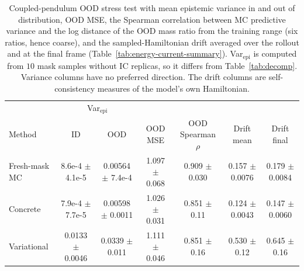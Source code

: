 \begin{table}[t]
\centering
\small
\setlength{\tabcolsep}{3pt}
\caption{Coupled-pendulum OOD stress test with mean epistemic variance in and out of distribution, OOD MSE, the Spearman correlation between MC predictive variance and the log distance of the OOD mass ratio from the training range (six ratios, hence coarse), and the sampled-Hamiltonian drift averaged over the rollout and at the final frame (Table~\ref{tab:energy-current-summary}). Var$_\mathrm{epi}$ is computed from $10$ mask samples without IC replicas, so it differs from Table~\ref{tab:decomp}. Variance columns have no preferred direction. The drift columns are self-consistency measures of the model's own Hamiltonian.}
\label{tab:coupled-pendulum-ood-energy}
\begin{tabular}{lcccccc}
\toprule
 & \multicolumn{2}{c}{Var$_\mathrm{epi}$} &  &  &  &  \\
\cmidrule(lr){2-3}
Method & ID & OOD & OOD MSE & \makecell{OOD Spearman\\ $\rho$} & \makecell{Drift\\ mean} & \makecell{Drift\\ final} \\
\midrule
Fresh-mask MC & \makecell{8.6e-4\\ {\footnotesize $\pm$ 4.1e-5}} & \makecell{0.00564\\ {\footnotesize $\pm$ 7.4e-4}} & \makecell{1.097\\ {\footnotesize $\pm$ 0.068}} & \makecell{0.909\\ {\footnotesize $\pm$ 0.030}} & \makecell{0.157\\ {\footnotesize $\pm$ 0.0076}} & \makecell{0.179\\ {\footnotesize $\pm$ 0.0084}} \\
Concrete & \makecell{7.9e-4\\ {\footnotesize $\pm$ 7.7e-5}} & \makecell{0.00598\\ {\footnotesize $\pm$ 0.0011}} & \makecell{1.026\\ {\footnotesize $\pm$ 0.031}} & \makecell{0.851\\ {\footnotesize $\pm$ 0.11}} & \makecell{0.124\\ {\footnotesize $\pm$ 0.0043}} & \makecell{0.147\\ {\footnotesize $\pm$ 0.0060}} \\
Variational & \makecell{0.0133\\ {\footnotesize $\pm$ 0.0046}} & \makecell{0.0339\\ {\footnotesize $\pm$ 0.011}} & \makecell{1.111\\ {\footnotesize $\pm$ 0.046}} & \makecell{0.851\\ {\footnotesize $\pm$ 0.16}} & \makecell{0.530\\ {\footnotesize $\pm$ 0.12}} & \makecell{0.645\\ {\footnotesize $\pm$ 0.16}} \\

\end{tabular}
\end{table}
